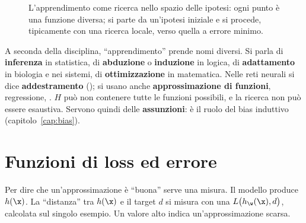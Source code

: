 \begin{figure}[ht]
\centering
{}
\caption{L'apprendimento come ricerca nello spazio delle ipotesi: ogni punto è una funzione diversa; si parte da
un'ipotesi iniziale e si procede, tipicamente con una ricerca locale, verso quella a errore minimo.}
\label{fig:ricerca-h}
\end{figure}

A seconda della disciplina, ``apprendimento'' prende nomi diversi. Si parla di \textbf{inferenza} in statistica,
di \textbf{abduzione} o \textbf{induzione} in logica, di \textbf{adattamento} in biologia e nei sistemi, di
\textbf{ottimizzazione} in matematica. Nelle reti neurali si dice \textbf{addestramento} (); si
usano anche \textbf{approssimazione di funzioni}, regressione, . $H$ può non contenere tutte
le funzioni possibili, e la ricerca non può essere esaustiva. Servono quindi delle \textbf{assunzioni}: è il ruolo
del bias induttivo (capitolo~\ref{cap:bias}).

\section{Funzioni di loss ed errore}
\label{sec:loss}

Per dire che un'approssimazione è ``buona'' serve una misura. Il modello produce $h(\x)$. La ``distanza'' tra
$h(\x)$ e il target $d$ si misura con una  $L\big(h_\w(\x), d\big)$, calcolata sul
singolo esempio. Un valore alto indica un'approssimazione scarsa.

